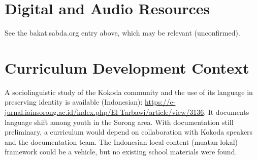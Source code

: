 \documentclass[12pt]{article}
\begin{document}
\section{Digital and Audio Resources}
See the bakat.sabda.org entry above, which may be relevant (unconfirmed).

\section{Curriculum Development Context}
A sociolinguistic study of the Kokoda community and the use of its language in preserving identity is available (Indonesian): \url{https://e-jurnal.iainsorong.ac.id/index.php/El-Tarbawi/article/view/3136}. It documents language shift among youth in the Sorong area. With documentation still preliminary, a curriculum would depend on collaboration with Kokoda speakers and the documentation team. The Indonesian local-content (muatan lokal) framework could be a vehicle, but no existing school materials were found.
\end{document}
